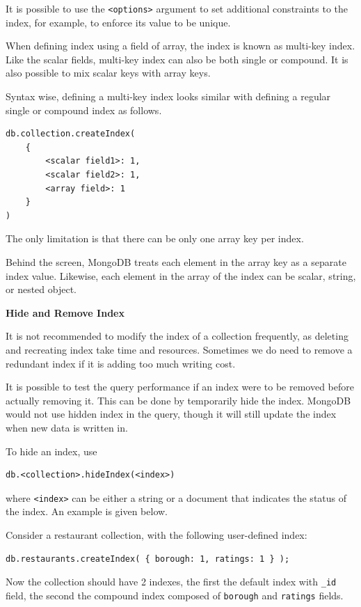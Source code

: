 It is possible to use the \verb|<options>| argument to set additional constraints to the index, for example, to enforce its value to be unique.

When defining index using a field of array, the index is known as multi-key index. Like the scalar fields, multi-key index can also be both single or compound. It is also possible to mix scalar keys with array keys.

Syntax wise, defining a multi-key index looks similar with defining a regular single or compound index as follows.
\begin{lstlisting}
db.collection.createIndex(
	{
		<scalar field1>: 1,
		<scalar field2>: 1,
		<array field>: 1
	}
)
\end{lstlisting}
The only limitation is that there can be only one array key per index.

Behind the screen, MongoDB treats each element in the array key as a separate index value. Likewise, each element in the array of the index can be scalar, string, or nested object.

\vspace{0.1in}
\noindent \textbf{Hide and Remove Index}
\vspace{0.1in}

It is not recommended to modify the index of a collection frequently, as deleting and recreating index take time and resources. Sometimes we do need to remove a redundant index if it is adding too much writing cost.

It is possible to test the query performance if an index were to be removed before actually removing it. This can be done by temporarily hide the index. MongoDB would not use hidden index in the query, though it will still update the index when new data is written in.

To hide an index, use
\begin{lstlisting}
db.<collection>.hideIndex(<index>)
\end{lstlisting}
where \verb|<index>| can be either a string or a document that indicates the status of the index. An example is given below.

Consider a restaurant collection, with the following user-defined index:
\begin{lstlisting}
db.restaurants.createIndex( { borough: 1, ratings: 1 } );
\end{lstlisting}
Now the collection should have 2 indexes, the first the default index with \verb|_id| field, the second the compound index composed of \verb|borough| and \verb|ratings| fields.

